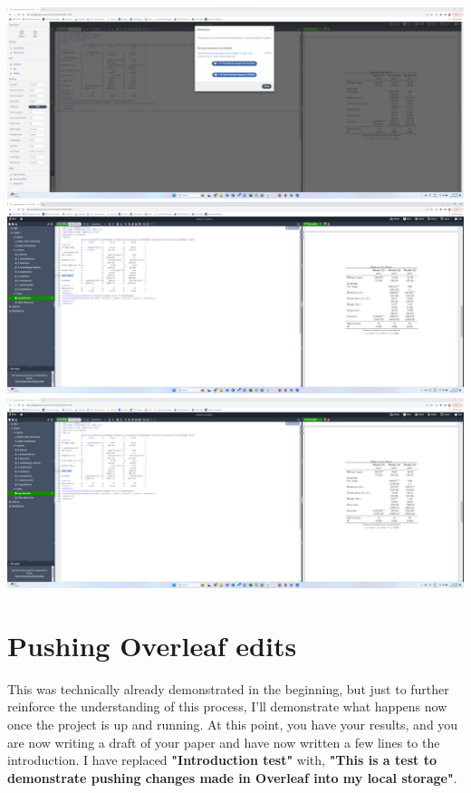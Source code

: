 \documentclass[12pt]{article}
\begin{document}
\includegraphics[width=1\textwidth]{Instructions/project_template_screenshots/project_template_24.png} \\

\includegraphics[width=1\textwidth]{Instructions/project_template_screenshots/project_template_25.png} \\

\includegraphics[width=1\textwidth]{Instructions/project_template_screenshots/project_template_26.png} \\

\section{Pushing Overleaf edits}

This was technically already demonstrated in the beginning, but just to further reinforce the understanding of this process, I'll demonstrate what happens now once the project is up and running. At this point, you have your results, and you are now writing a draft of your paper and have now written a few lines to the introduction. I have replaced \textbf{"Introduction test"} with, \textbf{"This is a test to demonstrate pushing changes made in Overleaf into my local storage"}. \\
\end{document}
